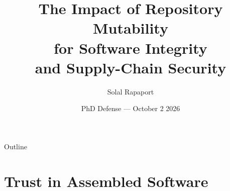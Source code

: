 \documentclass[aspectratio=169]{beamer}
\title[]{The Impact of Repository Mutability\\ for Software Integrity\\ and Supply-Chain Security}
\subtitle{}
\author{Solal Rapaport}
\institute{}
\date[PhD Defense --- October 2 2026]{PhD Defense --- October 2 2026}
\begin{document}
\maketitle

\begin{frame}{Outline}
    \small
    \tableofcontents
\end{frame}


\section{Trust in Assembled Software}
\end{document}
